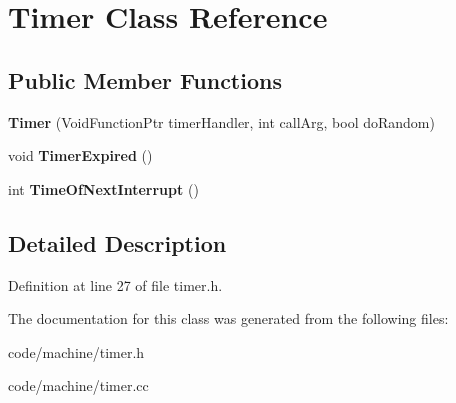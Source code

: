 \section{Timer Class Reference}
\label{class_timer}
\subsection*{Public Member Functions}
\begin{DoxyCompactItemize}
\item 
{\bfseries Timer} (Void\+Function\+Ptr timer\+Handler, int call\+Arg, bool do\+Random)\label{class_timer_ad6f578a6b75f1073e7c6919cf8a507ee}

\item 
void {\bfseries Timer\+Expired} ()\label{class_timer_ad0198c93d207f2f303b3c5ff5cfd8ef4}

\item 
int {\bfseries Time\+Of\+Next\+Interrupt} ()\label{class_timer_a2846bc4b6ef4ad61e3de987aee4d85ab}

\end{DoxyCompactItemize}


\subsection{Detailed Description}


Definition at line 27 of file timer.\+h.



The documentation for this class was generated from the following files\+:\begin{DoxyCompactItemize}
\item 
code/machine/timer.\+h\item 
code/machine/timer.\+cc\end{DoxyCompactItemize}
